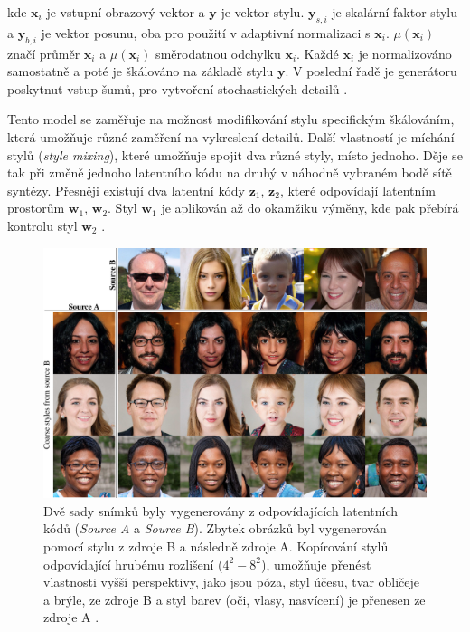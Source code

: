 \noindent kde $\textbf{x}_i$ je vstupní obrazový vektor a $\textbf{y}$ je vektor stylu. $\textbf{y}_{s,i}$ je skalární faktor stylu a $\textbf{y}_{b,i}$ je vektor posunu, oba pro použití v adaptivní normalizaci s $\textbf{x}_i$. $\mu(\textbf{x}_i)$ značí průměr $\textbf{x}_i$ a $\mu(\textbf{x}_i)$ směrodatnou odchylku $\textbf{x}_i$.  Každé $\textbf{x}_i$ je normalizováno samostatně a poté je škálováno na základě stylu $\textbf{y}$. V poslední řadě je generátoru poskytnut vstup šumů, pro vytvoření stochastických detailů \cite{KarrasStyleGAN}.

\bigskip

\noindent Tento model se zaměřuje na možnost modifikování stylu specifickým škálováním, která umožňuje různé zaměření na vykreslení detailů. Další vlastností je míchání stylů (\textit{style mixing}), které umožňuje spojit dva různé styly, místo jednoho. Děje se tak při změně jednoho latentního kódu na druhý v náhodně vybraném bodě sítě syntézy. Přesněji existují dva latentní kódy $\textbf{z}_1$, $\textbf{z}_2$, které odpovídají latentním prostorům $\textbf{w}_1$, $\textbf{w}_2$. Styl $\textbf{w}_1$ je aplikován až do okamžiku výměny, kde pak přebírá kontrolu styl $\textbf{w}_2$ \cite{KarrasStyleGAN}.

\begin{figure}[H]
	\centering
	\includegraphics[width=1\textwidth]{obrazky-figures/mixing-stylegan-part.png}
	\caption{Dvě sady snímků byly vygenerovány z odpovídajících latentních kódů (\textit{Source A} a \textit{Source B}). Zbytek obrázků byl vygenerován pomocí stylu z zdroje B a následně zdroje A. Kopírování stylů odpovídající hrubému rozlišení ($4^2 - 8^2$), umožňuje přenést vlastnosti vyšší perspektivy, jako jsou póza, styl účesu, tvar obličeje a brýle, ze zdroje B a styl barev (oči, vlasy, nasvícení) je přenesen ze zdroje A \cite{KarrasStyleGAN}.}
        \label{fig:mix-stylegan}
\end{figure}

